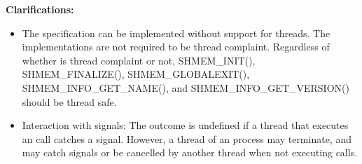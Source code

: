 {\bf Clarifications:}
 
\begin{itemize}
\item[]
The \openshmem{} specification can be implemented without support for threads.
The \openshmem{} implementations are not required to be thread complaint.
Regardless of whether \openshmem{} is thread complaint or not, SHMEM\_INIT(),
SHMEM\_FINALIZE(), SHMEM\_GLOBALEXIT(), SHMEM\_INFO\_GET\_NAME(), and
SHMEM\_INFO\_GET\_VERSION() should be thread safe.
 
\item[]
Interaction with signals: The outcome is undefined if a thread that executes an
\openshmem{} call catches a signal. However, a thread of an \openshmem{} process
may terminate, and may catch signals or be cancelled by another thread when not
executing \openshmem{} calls.
\end{itemize}
